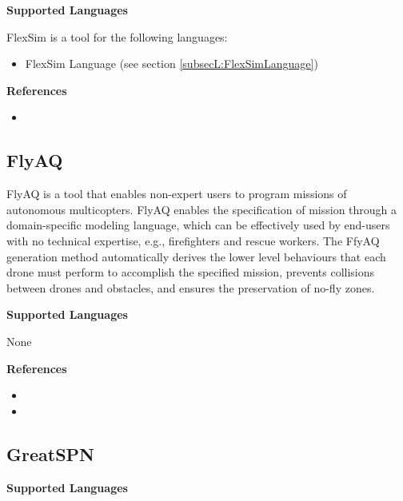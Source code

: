 \textbf{Supported Languages}

FlexSim is a tool for the following languages:
\begin{itemize}
	\item FlexSim Language (see section \ref{subsecL:FlexSimLanguage})
\end{itemize}


\textbf{References}
\begin{itemize}
	
\item {}
\end{itemize}



\subsection{FlyAQ}
\label{subsecT:FlyAQ}


FlyAQ is a tool that enables non-expert users to program missions of autonomous multicopters. FlyAQ enables the specification of mission through a domain-specific modeling language, which can be effectively used by end-users with no technical expertise, e.g., firefighters and rescue workers. The FfyAQ generation method automatically derives the lower level behaviours that each drone must perform to accomplish the specified mission, prevents collisions between drones and obstacles, and ensures the preservation of no-fly zones.

\textbf{Supported Languages}

None


\textbf{References}
\begin{itemize}
	
\item {}
	
\item {}
\end{itemize}



\subsection{GreatSPN}
\label{subsecT:GreatSPN}



\textbf{Supported Languages}

